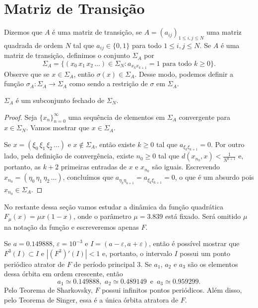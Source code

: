 \section{Matriz de Transição}

Dizemos que $A$ é uma matriz de transição, se $A = (a_{ij})_{1 \leq i,j \leq N}$ uma matriz quadrada de ordem $N$ tal que $a_{ij} \in \lbrace 0, 1 \rbrace$ para todo $1 \leq i,j \leq N$.
Se $A$ é uma matriz de transição, definimos o conjunto $\Sigma_A$ por
$$\Sigma_A = \lbrace (x_0 \, x_1 \, x_2 \, \dots) \in \Sigma_N : a_{x_k x_{k+1}} = 1 \text{ para todo } k \geq 0 \rbrace.$$
Observe que se $x \in \Sigma_A$, então $\sigma(x) \in \Sigma_A$.
Desse modo, podemos definir a função $\sigma_A: \Sigma_A \to \Sigma_A$ como sendo a restrição de $\sigma$ em $\Sigma_A$.

\begin{proposition}
$\Sigma_A$ é um subconjunto fechado de $\Sigma_N$.
\end{proposition}

\begin{proof}
Seja $\lbrace x_n \rbrace_{n=0}^{\infty}$ uma sequência de elementos em $\Sigma_A$ convergente para $x \in \Sigma_N$.
Vamos mostrar que $x \in \Sigma_A$.

Se $x = (\xi_0 \, \xi_1 \, \xi_2 \, \dots)$ e $x \notin \Sigma_A$, então existe $k \geq 0$ tal que $a_{\xi_k \xi_{k+1}} = 0$. Por outro lado, pela definição de convergência, existe $n_0 \geq 0$ tal que $d(x_{n_0}, x) < \frac{1}{N^{k+1}}$ e, portanto, as $k+2$ primeiras entradas de $x$ e $x_{n_0}$ são iguais. Escrevendo $x_{n_0} = (\eta_0 \, \eta_1 \, \eta_2 \, \dots)$, concluímos que $a_{\eta_k \eta_{k+1}} = a_{\xi_k \xi_{k+1}} = 0$, o que é um absurdo pois $x_{n_0} \in \Sigma_A$.
\end{proof}

No restante dessa seção vamos estudar a dinâmica da função quadrática $F_\mu(x) = \mu x(1-x)$, onde o parâmetro $\mu = 3.839$ está fixado. Será omitido $\mu$ na notação da função e escreveremos apenas $F$.

Se $a = 0.149888$, $\varepsilon = 10^{-3}$ e $I = (a - \varepsilon, a + \varepsilon)$, então é possível mostrar que $F^3(I) \subset I$ e $|(F^3)'(I)| < 1$ e, portanto, o intervalo $I$ possui um ponto periódico atrator de $F$ de período principal $3$. Se $a_1$, $a_2$ e $a_3$ são os elementos dessa órbita em ordem crescente, então
$$a_1 \simeq 0.149888 \text{, } \, a_2 \simeq 0.489149 \, \text{ e } \, a_3 \simeq 0.959299.$$
Pelo Teorema de Sharkovsky, $F$ possui infinitos pontos periódicos. Além disso, pelo Teorema de Singer, essa é a única órbita atratora de $F$.

